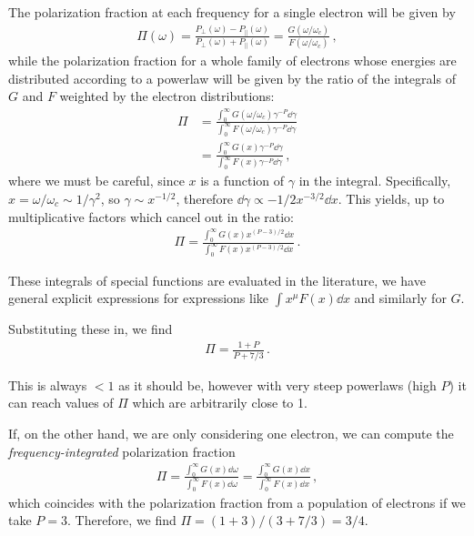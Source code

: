 \documentclass[main.tex]{subfiles}
\begin{document}
The polarization fraction at each frequency for a single electron will be given by 
%
\begin{align}
\Pi (\omega ) 
= \frac{P_\perp (\omega ) - P_\parallel (\omega )}{P_\perp (\omega ) + P_\parallel (\omega )}
= \frac{G( \omega / \omega _c) }{F(\omega / \omega _c)}
\,,
\end{align}
%
while the polarization fraction for a whole family of electrons whose energies are distributed according to a powerlaw will be given by the ratio of the integrals of \(G\) and \(F\) weighted by the electron distributions:  
%
\begin{align}
\Pi &= \frac{\int_0^{\infty } G (\omega / \omega _c) \gamma^{-P} \dd{\gamma }}{\int_0^{\infty } F(\omega  / \omega _c) \gamma^{-P} \dd{\gamma }}  \\
&= \frac{\int_0^{\infty } G (x) \gamma^{-P} \dd{\gamma }}{\int_0^{\infty } F(x) \gamma^{-P} \dd{\gamma }}
\,,
\end{align}
%
where we must be careful, since \(x\) is a function of \(\gamma \) in the integral. Specifically, \(x = \omega / \omega _c \sim 1/ \gamma^2\), so \(\gamma \sim x^{-1/2}\), therefore \(\dd{\gamma } \propto -1/2 x^{-3/2} \dd{x}\). This yields, up to multiplicative factors which cancel out in the ratio: 
%
\begin{align}
\Pi = \frac{\int_0^{\infty } G(x) x^{(P-3) / 2} \dd{x}}{\int_0^{\infty } F(x) x^{(P-3) / 2} \dd{x}}
\,.
\end{align}

These integrals of special functions are evaluated in the literature, we have general explicit expressions for expressions like \(\int x^{\mu } F(x) \dd{x}\) and similarly for \(G\).

Substituting these in, we find 
%
\begin{align}
\Pi = \frac{1 + P}{P + 7/3}
\,.
\end{align}

This is always \(<1\) as it should be, however with very steep powerlaws (high \(P\)) it can reach values of \(\Pi \) which are arbitrarily close to 1.

If, on the other hand, we are only considering one electron, we can compute the \emph{frequency-integrated} polarization fraction 
%
\begin{align}
\Pi 
= \frac{\int_0^{\infty } G(x) \dd{\omega }}{\int_0^{\infty } F(x) \dd{\omega }}
= \frac{\int_0^{\infty } G(x) \dd{x}}{\int_0^{\infty } F(x) \dd{x }}
\,,
\end{align}
%
which coincides with the polarization fraction from a population of electrons if we take \(P = 3\). Therefore, we find \(\Pi = (1+3) / (3 + 7/3) = 3/4\). 
\end{document}
